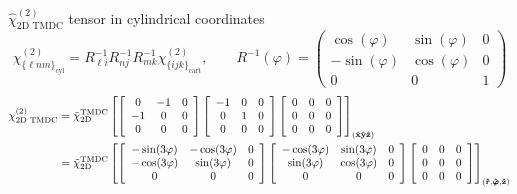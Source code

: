 \documentclass[
aspectratio=169,
16pt,
xcolor={dvipsnames} %
]{beamer}
\begin{document}
	\begin{frame}{$\hat{\chi}^{(2)}_{\text{2D TMDC}}$ tensor in cylindrical coordinates}
		\begin{equation*}
			\chi^{(2)}_{\{\ell n m\}_{\text{cyl}}} = R^{-1}_{\ell i} R^{-1}_{n j} R^{-1}_{m k} \chi^{(2)}_{\{ijk\}_{\text{cart}}}, \qquad R^{-1}(\varphi) = \begin{pmatrix}
				\cos(\varphi) & \sin(\varphi) & 0 \\
				-\sin(\varphi) & \cos(\varphi) & 0 \\
				0 & 0  & 1
			\end{pmatrix}
		\end{equation*}
		{\tiny\begin{align*}
				\chi^{(2)}_{\text{2D TMDC}}  = \tilde{\chi}^{\text{TMDC}}_{\text{2D}}
				&\left[\left[\begin{array}{ccc}
					0 & -1 & 0 \\
					-1 & 0 & 0 \\
					0 & 0 & 0
				\end{array}\right]\left[\begin{array}{ccc}
					-1 & 0 & 0 \\
					0 & 1 & 0 \\
					0 & 0 & 0
				\end{array}\right]\left[\begin{array}{lll}
					0 & 0 & 0 \\
					0 & 0 & 0 \\
					0 & 0 & 0
				\end{array}\right]\right]_{(\vu{x}\vu{y}\vu{z})}
				\\ = \tilde{\chi}^{\text{TMDC}}_{\text{2D}}
				&\left[\left[\begin{array}{ccc}
					-\sin (3 \varphi) & -\cos (3 \varphi) & 0 \\
					-\cos (3 \varphi) & \sin (3 \varphi) & 0 \\
					0 & 0 & 0
				\end{array}\right]\left[\begin{array}{ccc}
					-\cos (3 \varphi) & \sin (3 \varphi) & 0 \\
					\sin (3 \varphi) & \cos (3 \varphi) & 0 \\
					0 & 0 & 0
				\end{array}\right]\left[\begin{array}{lll}
					0 & 0 & 0 \\
					0 & 0 & 0 \\
					0 & 0 & 0
				\end{array}\right]\right]_{(\vu{r},\vu{\boldsymbol{\varphi}}, \vu{z})}

\end{align*}}
\end{frame}
\end{document}
